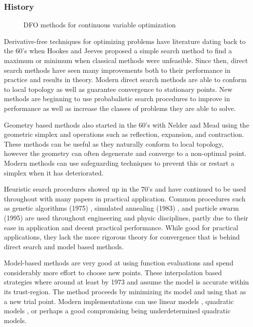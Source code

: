 \subsubsection*{History}
\begin{figure}
\centering

\caption{DFO methods for continuous variable optimization}
\end{figure}
Derivative-free techniques for optimizing problems have literature dating back to the 60's when Hookes and Jeeves \cite{hooke_1961} proposed a simple search method to find a maximum or minimum when classical methods were unfeasible.  Since then, direct search methods have seen many improvements both to their performance in practice and results in theory.  Modern direct search methods are able to conform to local topology as well as guarantee convergence to stationary points.  New methods are beginning to use probabalistic search procedures to improve in performance as well as increase the classes of problems they are able to solve.

Geometry based methods also started in the 60's with Nelder and Mead \cite{nelder_1965} using the geometric simplex and operations such as reflection, expansion, and contraction.  These methods can be useful as they naturally conform to local topology, however the geometry can often degenerate and converge to a non-optimal point.  Modern methods can use safeguarding techniques to prevent this or restart a simplex when it has deteriorated.  

Heuristic search procedures showed up in the 70's and have continued to be used throughout with many papers in practical application.  Common procedures such as genetic algorithms (1975) \cite{holland_1975}, simulated annealing (1983) \cite{kirkpatrick_1983}, and particle swarm (1995) \cite{eberhart_1995} \cite{kennedy_1995} are used throughout engineering and physic disciplines, partly due to their ease in application and decent practical performance.  While good for practical applications, they lack the more rigorous theory for convergence that is behind direct search and model based methods.

Model-based methods are very good at using function evaluations and spend considerably more effort to choose new points.  These interpolation based strategies where around at least by 1973 \cite{winfield_1973} and assume the model is accurate within its trust-region.  The method proceeds by minimizing its model and using that as a new trial point.  Modern implementations can use linear models \cite{powell_1994}, quadratic models \cite{powell_2002}, or perhaps a good compromising being underdetermined quadratic models.

